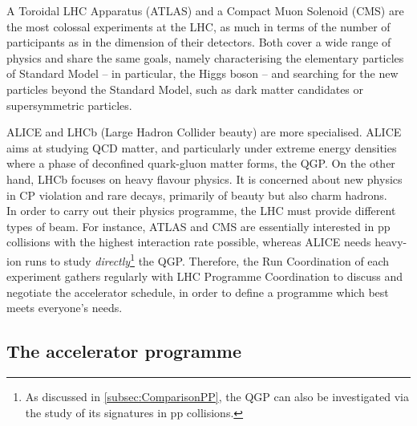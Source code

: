 A Toroidal LHC Apparatus (ATLAS) and a Compact Muon Solenoid (CMS) are the most colossal experiments at the LHC, as much in terms of the number of participants as in the dimension of their detectors. Both cover a wide range of physics and share the same goals, namely characterising the elementary particles of Standard Model -- in particular, the Higgs boson -- and searching for the new particles beyond the Standard Model, such as dark matter candidates or supersymmetric particles. 

ALICE and LHCb (Large Hadron Collider beauty) are more specialised. ALICE aims at studying QCD matter, and particularly under extreme energy densities where a phase of deconfined quark-gluon matter forms, the QGP. On the other hand, LHCb focuses on heavy flavour physics. It is concerned about new physics in CP violation and rare decays, primarily of beauty but also charm hadrons.\\

In order to carry out their physics programme, the LHC must provide different types of beam. For instance, ATLAS and CMS are essentially interested in pp collisions with the highest interaction rate possible, whereas ALICE needs heavy-ion runs to study \textit{directly}\footnote{As discussed in \Sec\ref{subsec:ComparisonPP}, the QGP can also be investigated via the study of its signatures in pp collisions.} the QGP. Therefore, the Run Coordination of each experiment gathers regularly with LHC Programme Coordination to discuss and negotiate the accelerator schedule, in order to define a programme which best meets everyone's needs.

\subsection{The accelerator programme}

